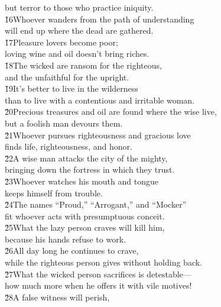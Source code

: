 \begin{poetry}
\poemll    but terror to those who practice iniquity. \\
\poeml \v{16}Whoever wanders from the path of understanding \\
\poemll    will end up where the dead are gathered. \\
\poeml \v{17}Pleasure lovers become poor; \\
\poemll    loving wine and oil doesn't bring riches. \\
\poeml \v{18}The wicked are ransom for the righteous, \\
\poemll    and the unfaithful for the upright. \\
\poeml \v{19}It's better to live in the wilderness \\
\poemll    than to live with a contentious and irritable woman. \\
\poeml \v{20}Precious treasures and oil are found where the wise live, \\
\poemll    but a foolish man devours them. \\
\poeml \v{21}Whoever pursues righteousness and gracious love \\
\poemll    finds life, righteousness, and honor. \\
\poeml \v{22}A wise man attacks the city of the mighty, \\
\poemll    bringing down the fortress in which they trust. \\
\poeml \v{23}Whoever watches his mouth and tongue \\
\poemll    keeps himself from trouble. \\
\poeml \v{24}The names ``Proud,'' ``Arrogant,'' and ``Mocker'' \\
\poemll    fit whoever acts with presumptuous conceit. \\
\poeml \v{25}What the lazy person craves will kill him, \\
\poemll    because his hands refuse to work. \\
\poeml \v{26}All day long he continues to crave, \\
\poemll    while the righteous person gives without holding back. \\
\poeml \v{27}What the wicked person sacrifices is detestable--- \\
\poemll    how much more when he offers it with vile motives! \\
\poeml \v{28}A false witness will perish, \\

\end{poetry}
